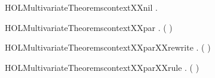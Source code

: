 \newcommand{\HOLMultivariateTheoremscontextXXcombin}{\UseVerbatim{HOLMultivariateTheoremscontextXXcombin}}
\begin{SaveVerbatim}{HOLMultivariateTheoremscontextXXnil}
\HOLTokenTurnstile{} \HOLSymConst{\HOLTokenForall{}}.   
\end{SaveVerbatim}
\newcommand{\HOLMultivariateTheoremscontextXXnil}{\UseVerbatim{HOLMultivariateTheoremscontextXXnil}}
\begin{SaveVerbatim}{HOLMultivariateTheoremscontextXXpar}
\HOLTokenTurnstile{} \HOLSymConst{\HOLTokenForall{}}  .
         ( \HOLSymConst{\ensuremath{\parallel}} ) \HOLSymConst{\HOLTokenImp{}}    \HOLSymConst{\HOLTokenConj{}}   
\end{SaveVerbatim}
\newcommand{\HOLMultivariateTheoremscontextXXpar}{\UseVerbatim{HOLMultivariateTheoremscontextXXpar}}
\begin{SaveVerbatim}{HOLMultivariateTheoremscontextXXparXXrewrite}
\HOLTokenTurnstile{} \HOLSymConst{\HOLTokenForall{}}  .
         ( \HOLSymConst{\ensuremath{\parallel}} ) \HOLSymConst{\HOLTokenEquiv{}}    \HOLSymConst{\HOLTokenConj{}}   
\end{SaveVerbatim}
\newcommand{\HOLMultivariateTheoremscontextXXparXXrewrite}{\UseVerbatim{HOLMultivariateTheoremscontextXXparXXrewrite}}
\begin{SaveVerbatim}{HOLMultivariateTheoremscontextXXparXXrule}
\HOLTokenTurnstile{} \HOLSymConst{\HOLTokenForall{}}  .
          \HOLSymConst{\HOLTokenConj{}}    \HOLSymConst{\HOLTokenImp{}}   ( \HOLSymConst{\ensuremath{\parallel}} )
\end{SaveVerbatim}
